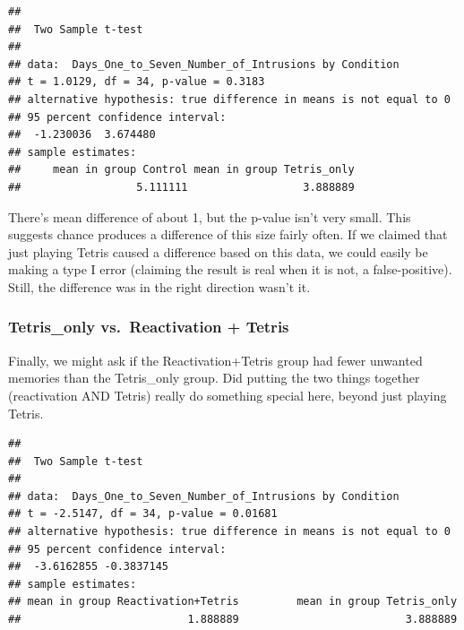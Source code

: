 \documentclass[]{book}
\newenvironment{Shaded}{\begin{snugshade}}{\end{snugshade}}
\newcommand{\KeywordTok}[1]{\textcolor[rgb]{0.13,0.29,0.53}{\textbf{{#1}}}}
\newcommand{\DataTypeTok}[1]{\textcolor[rgb]{0.13,0.29,0.53}{{#1}}}
\newcommand{\StringTok}[1]{\textcolor[rgb]{0.31,0.60,0.02}{{#1}}}
\newcommand{\OtherTok}[1]{\textcolor[rgb]{0.56,0.35,0.01}{{#1}}}
\newcommand{\NormalTok}[1]{{#1}}
\theoremstyle{definition}
\theoremstyle{definition}
\theoremstyle{definition}
\theoremstyle{remark}
\begin{document}
\begin{verbatim}
## 
##  Two Sample t-test
## 
## data:  Days_One_to_Seven_Number_of_Intrusions by Condition
## t = 1.0129, df = 34, p-value = 0.3183
## alternative hypothesis: true difference in means is not equal to 0
## 95 percent confidence interval:
##  -1.230036  3.674480
## sample estimates:
##     mean in group Control mean in group Tetris_only 
##                  5.111111                  3.888889
\end{verbatim}

There's mean difference of about 1, but the p-value isn't very small.
This suggests chance produces a difference of this size fairly often. If
we claimed that just playing Tetris caused a difference based on this
data, we could easily be making a type I error (claiming the result is
real when it is not, a false-positive). Still, the difference was in the
right direction wasn't it.

\subsubsection{Tetris\_only vs.~Reactivation +
Tetris}\label{tetris_only-vs.reactivation-tetris}

Finally, we might ask if the Reactivation+Tetris group had fewer
unwanted memories than the Tetris\_only group. Did putting the two
things together (reactivation AND Tetris) really do something special
here, beyond just playing Tetris.

\begin{Shaded}
\end{Shaded}

\begin{verbatim}
## 
##  Two Sample t-test
## 
## data:  Days_One_to_Seven_Number_of_Intrusions by Condition
## t = -2.5147, df = 34, p-value = 0.01681
## alternative hypothesis: true difference in means is not equal to 0
## 95 percent confidence interval:
##  -3.6162855 -0.3837145
## sample estimates:
## mean in group Reactivation+Tetris         mean in group Tetris_only 
##                          1.888889                          3.888889
\end{verbatim}
\end{document}
